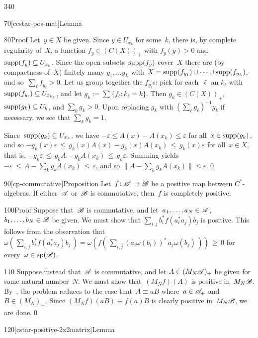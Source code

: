 \begin{parsec}{340}
\begin{point}{70}[ccstar-pos-mat]{Lemma}
\begin{point}{80}{Proof}
Let~$y\in X$ be given. Since $y\in U_{x_k}$
for some~$k$, there is, by complete regularity of~$X$,
a function $f_y\in (C(X))_+$
with $f_y(y)>0$
and $\operatorname{supp}(f_y)\subseteq U_{x_k}$.
Since the open subsets~$\operatorname{supp}(f_y)$
cover~$X$
there are (by compactness of~$X$) finitely many $y_1,\dotsc y_L$
with $X = \operatorname{supp}(f_{y_1})\cup \dotsb \cup \operatorname{supp}(f_{y_L})$,
and so~$\sum_\ell f_{y_\ell} > 0$.
Let us group together the $f_{y_\ell}$s:
pick for each~$\ell$ an $k_\ell$ with $\operatorname{supp}(f_{y_\ell})\subseteq 
U_{x_{k_\ell}}$,
and let $g_k:= \sum\{f_\ell\colon k_\ell = k\}$.
Then $g_k\in (C(X))_+$,
$\operatorname{supp}(g_k)\subseteq U_k$,
and $\sum_k g_k >0$.
	Upon replacing $g_k$ with $(\sum_\ell g_\ell)^{-1} g_k$ if necessary,
we see that $\sum_k g_k=1$.

Since~$\operatorname{supp}(g_k)\subseteq U_{x_k}$,
we have $-\varepsilon \leq A(x)-A(x_k)\leq \varepsilon$
for all~$x\in \operatorname{supp}(g_k)$,
and so  $-g_k(x) \varepsilon
\,\leq\, g_k(x) A(x) - g_k(x) A(x_k)\,\leq\, g_k(x) \varepsilon$
for all~$x\in X$,
that is,  $-g_k \varepsilon
\,\leq\, g_k A - g_k A(x_k)\,\leq\, g_k \varepsilon$.
Summing yields
$-\varepsilon \,\leq\, A- \sum_k g_k A(x_k)\,\leq\, \varepsilon$,
and so $\|A-\sum_k g_k A(x_k)\|\leq \varepsilon$.\qed
\end{point}
\end{point}
\begin{point}{90}[cp-commutative]{Proposition}%
Let~$f\colon \mathscr{A}\to\mathscr{B}$ be a 
positive map between $C^*$-algebras.
If either~$\mathscr{A}$ or~$\mathscr{B}$ is commutative,
then~$f$ is completely positive.
\begin{point}{100}{Proof}%
Suppose that~$\mathscr{B}$ is commutative,
and let~$a_1,\dotsc,a_N\in \mathscr{A}$,
$b_1,\dotsc,b_N\in\mathscr{B}$ be given.
We must
show that $\sum_{i,j} b_i^*f(a_i^*a_j)b_j$ is positive.
This follows from the observation that
$\omega(\,\sum_{i,j} b_i^*f(a_i^*a_j)b_j\,)
= \omega(f(\,\sum_{i,j}(a_i\omega(b_i))^*\,a_j \omega(b_j)\,))\,\geq \,0$
for every~$\omega\in\mathrm{sp}(\mathscr{B})$.
\begin{point}{110}%
Suppose instead that~$\mathscr{A}$ is commutative,
and let $A\in (M_N\mathscr{A})_+$
be given for some natural number~$N$.
We must show that~$(M_Nf)(A)$ is positive in~$M_N\mathscr{B}$.
By~,
the problem reduces to the case that~$A\equiv a B$
where~$a\in \mathscr{A}_+$ and~$B\in (M_N)_+$.
Since $(M_Nf)(aB)\equiv f(a)B$ is clearly positive
in~$M_N\mathscr{B}$,
we are done.\qed
\end{point}
\end{point}
\end{point}
\begin{point}{120}[cstar-positive-2x2matrix]{Lemma}%

\end{point}
\end{parsec}

